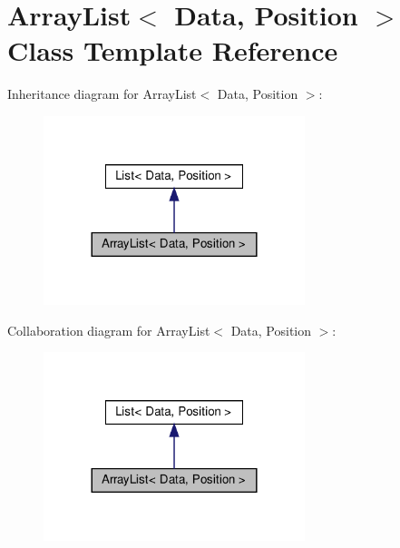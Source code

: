 \hypertarget{class_array_list}{}\section{Array\+List$<$ Data, Position $>$ Class Template Reference}
\label{class_array_list}


Inheritance diagram for Array\+List$<$ Data, Position $>$\+:\nopagebreak
\begin{figure}[H]
\begin{center}
\leavevmode
\includegraphics[width=216pt]{class_array_list__inherit__graph}
\end{center}
\end{figure}


Collaboration diagram for Array\+List$<$ Data, Position $>$\+:\nopagebreak
\begin{figure}[H]
\begin{center}
\leavevmode
\includegraphics[width=216pt]{class_array_list__coll__graph}
\end{center}
\end{figure}
